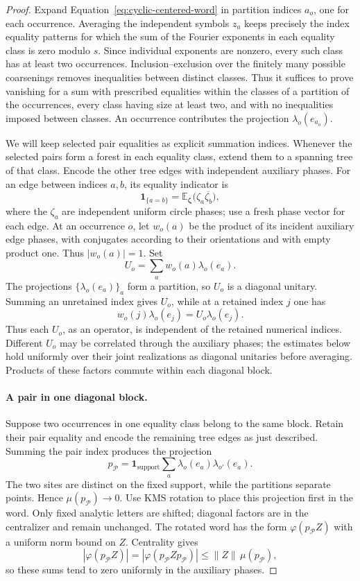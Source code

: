 \begin{proof}
Expand Equation~\eqref{eq:cyclic-centered-word} in partition indices
$a_o$, one for each occurrence. Averaging the independent symbols
$z_a$ keeps precisely the index equality patterns for which the sum
of the Fourier exponents in each equality class is zero modulo $s$.
Since individual exponents are nonzero, every such class has at least
two occurrences. Inclusion--exclusion over the finitely many possible
coarsenings removes inequalities between distinct classes. Thus it
suffices to prove vanishing for a sum with prescribed equalities within
the classes of a partition of the occurrences, every class having size
at least two, and with no inequalities imposed between classes. An
occurrence contributes the projection $\lambda_o(e_{a_o})$.

We will keep selected pair equalities as explicit summation indices.
Whenever the selected pairs form a forest in each equality class,
extend them to a spanning tree of that class. Encode the other tree edges with
independent auxiliary phases. For an edge between indices $a,b$, its
equality indicator is
\[
 \mathbf1_{\{a=b\}}
   =\mathbb E_{\boldsymbol\zeta}
      \bigl(\zeta_a\overline{\zeta_b}\bigr),
\]
where the $\zeta_a$ are independent uniform circle phases; use a fresh
phase vector for each edge. At an occurrence $o$, let $w_o(a)$ be the
product of its incident auxiliary edge phases, with conjugates according
to their orientations and with empty product one. Thus $|w_o(a)|=1$.
Set
\[
 U_o=\sum_a w_o(a)\lambda_o(e_a).
\]
The projections $\{\lambda_o(e_a)\}_a$ form a partition, so $U_o$ is a
diagonal unitary. Summing an unretained index gives $U_o$, while at a
retained index $j$ one has
\[
 w_o(j)\lambda_o(e_j)=U_o\lambda_o(e_j).
\]
Thus each $U_o$, as an operator, is independent of the retained numerical
indices. Different $U_o$ may be correlated through the auxiliary phases;
the estimates below hold uniformly over their joint realizations as
diagonal unitaries before averaging.
Products of these factors commute within each diagonal block.

\paragraph{A pair in one diagonal block.}
Suppose two occurrences in one equality class belong to the same block.
Retain their pair equality and encode the remaining tree edges as just
described. Summing the pair index produces the projection
\[
 p_{\mathcal P}
  =\mathbf1_{\mathrm{support}}
    \sum_a\lambda_o(e_a)\lambda_{o'}(e_a).
\]
The two sites are distinct on the fixed support, while the partitions
separate points. Hence $\mu(p_{\mathcal P})\to0$. Use KMS rotation to
place this projection first in the word. Only fixed analytic letters
are shifted; diagonal factors are in the centralizer and remain
unchanged. The rotated word has the form $\varphi(p_{\mathcal P}Z)$
with a uniform norm bound on $Z$. Centrality gives
\[
 |\varphi(p_{\mathcal P}Z)|
 =|\varphi(p_{\mathcal P}Zp_{\mathcal P})|
 \le\|Z\|\,\mu(p_{\mathcal P}),
\]
so these sums tend to zero uniformly in the auxiliary phases.


\end{proof}
